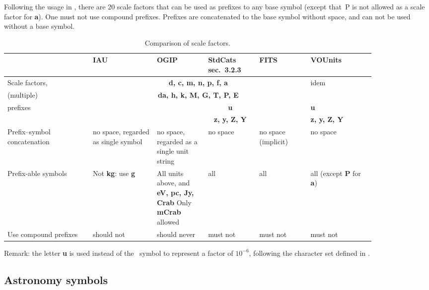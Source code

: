 \documentclass[12pt,notitlepage,onecolumn]{ivoa}
\newcommand{\unit}[1]{\textbf{\textsf{\color{orange}#1}}}
\def\micro{{\symbo \char109}}
\begin{document}
Following the usage in , there are 20 scale factors that can be used as
prefixes to any base symbol (except that~P is not allowed as a scale factor for \unit{a}). One must not use compound prefixes. Prefixes are concatenated to the base
symbol without space, and can not be used without a base symbol.
\begin{table}
\begin{tabular}{|p{0.2\linewidth}|p{0.15\linewidth}|p{0.12\linewidth}|p{0.12\linewidth}|p{0.12\linewidth}|p{0.15\linewidth}|}
\hline
    & IAU & OGIP & StdCats sec.~3.2.3 & FITS & VOUnits\\\hline
    Scale factors,   & \multicolumn{4}{c|}{\unit{d, c, m, n, p, f, a}} & idem \\
    (multiple) & \multicolumn{4}{c|}{\unit{da, h, k, M, G, T, P, E}}  & \\
    prefixes & \unit{\micro} & \multicolumn{3}{c|}{\unit{u}} & \unit{u}\\
     &  & \multicolumn{3}{c|}{\unit{z, y, Z, Y}} & \unit{z, y, Z, Y}\\\hline
    Prefix--symbol concatenation & no space, regarded as single symbol\raggedright & no space, regarded as a single unit string\raggedright & no space & no space (implicit)\raggedright & no space\\\hline
    Prefix-able symbols  & Not \unit{kg}: use \unit{g}\raggedright & All units above, and \unit{eV, pc, Jy, Crab} Only \unit{mCrab} allowed\raggedright & all & all & all (except \unit{P} for \unit{a})\\\hline
    Use compound prefixes & should not & should never & must not & must not & must not\\\hline
\end{tabular}
  \caption{Comparison of scale factors.}
  \label{tab:comparUnitScale}
\end{table}

Remark: the letter \unit{u} is used instead of the \micro{}l to represent a factor of $10^{-6}$, 
following the character set defined in .

\subsection{Astronomy symbols}
\end{document}
